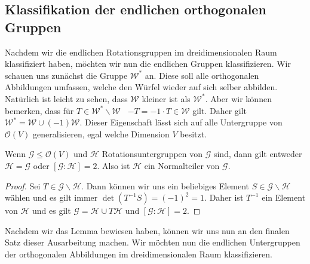 \subsection{Klassifikation der endlichen orthogonalen Gruppen}
Nachdem wir die endlichen Rotationsgruppen im dreidimensionalen Raum klassifiziert haben, möchten wir nun die endlichen Gruppen klassifizieren. Wir schauen uns zunächst die Gruppe $\mathcal{W}^*$ an. Diese soll alle orthogonalen Abbildungen umfassen, welche den Würfel wieder auf sich selber abbilden. Natürlich ist leicht zu sehen, dass $\mathcal{W}$ kleiner ist als $\mathcal{W}^*$. Aber wir können bemerken, dass für $T \in \mathcal{W}^*\backslash\mathcal{W}$ \ $-T = -1 \cdot T \in \mathcal{W}$ gilt. Daher gilt $\mathcal{W}^*=\mathcal{W}\cup(-1)\mathcal{W}$.
Dieser Eigenschaft lässt sich auf alle Untergruppe von $\mathcal{O}(V)$ generalisieren, egal welche Dimension $V$ besitzt.

\begin{lemma}
    Wenn $\mathcal{G} \leq \mathcal{O}(V)$ und $\mathcal{H}$ Rotationsuntergruppen von $\mathcal{G}$ sind, dann gilt entweder $\mathcal{H}=\mathcal{G}$ oder $[\mathcal{G}:\mathcal{H}] = 2$. Also ist $\mathcal{H}$ ein Normalteiler von $\mathcal{G}$.
\end{lemma}
\begin{proof}
    Sei $T \in \mathcal{G}\backslash\mathcal{H}$. Dann können wir uns ein beliebiges Element $S\in\mathcal{G}\backslash\mathcal{H}$ wählen und es gilt immer $\det(T^{-1}S) = (-1)^2=1$. Daher ist $T^{-1}$ ein Element von $\mathcal{H}$ und es gilt $\mathcal{G} = \mathcal{H} \cup T\mathcal{H}$ und $[\mathcal{G}:\mathcal{H}]=2$.
\end{proof}
Nachdem wir das Lemma bewiesen haben, können wir uns nun an den finalen Satz dieser Ausarbeitung machen. Wir möchten nun die endlichen Untergruppen der orthogonalen Abbildungen im dreidimensionalen Raum klassifizieren.

